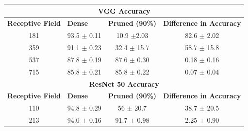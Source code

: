 \begin{table}[H]
  \centering
\begin{tabular}{@{}cccc@{}}
\toprule
\multicolumn{4}{c}{\textbf{VGG Accuracy}}                                                                                                                                                                          \\ \midrule
\multicolumn{1}{l}{\textbf{Receptive Field}} & \multicolumn{1}{l}{\textbf{Dense}} & \multicolumn{1}{l}{\textbf{Pruned
(90\%)}} & \multicolumn{1}{l}{\textbf{Difference in Accuracy}} \\
181                                          & 93.5 $\pm$ 0.11                                  & 10.9 $\pm$2.03                                    & 82.6 $\pm$ 2.02                                     \\
359                                          & 91.1 $\pm$ 0.23                                  & 32.4 $\pm$ 15.7                                   & 58.7 $\pm$ 15.8                                     \\
537                                          & 87.8 $\pm$ 0.19                                  & 87.6 $\pm$ 0.30                                   & 0.18 $\pm$ 0.16                                     \\
715                                          & 85.8 $\pm$ 0.21                                  & 85.8 $\pm$ 0.22                                   & 0.07 $\pm$ 0.04                                     \\ \midrule
\multicolumn{4}{c}{\textbf{ResNet 50 Accuracy}}                                                                                                                                                                    \\ \midrule
\multicolumn{1}{l}{\textbf{Receptive Field}} & \multicolumn{1}{l}{\textbf{Dense}} & \multicolumn{1}{l}{\textbf{Pruned
(90\%)}} & \multicolumn{1}{l}{\textbf{Difference in Accuracy}} \\
110                                          & 94.8 $\pm$ 0.29                                  & 56 $\pm$ 20.7                                     & 38.7 $\pm$ 20.5                                     \\
213                                          & 94.0 $\pm$ 0.16                                  & 91.7 $\pm$ 0.98                                   & 2.25 $\pm$ 0.90                                     \\

\end{tabular}
\end{table}
